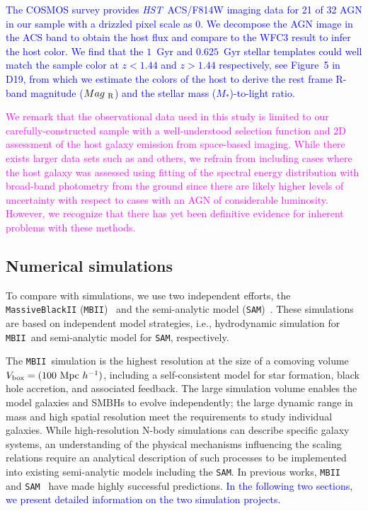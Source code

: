\documentclass[twocolumn,trackchanges]{aastex63}
\newcommand{\hst}{{\it HST}}
\newcommand{\mr}{$Mag_{\rm ~R}$}
\newcommand{\mstar}{{$M_*$}}
\newcommand{\sam}{\texttt{SAM}}
\newcommand{\mbii}{\texttt{MBII}}
\newcommand{\blue}[1]{{ \textcolor{blue}{#1}}}
\newcommand{\pink}[1]{{ \textcolor{magenta}{#1}}}
\begin{document}
\blue{The COSMOS survey provides \hst\ ACS/F814W imaging data for 21 of 32 AGN in our sample with a drizzled pixel scale as 0\farcs03. We decompose the AGN image in the ACS band to obtain the host flux and compare to the WFC3 result to infer the host color. We find that the $1$~Gyr and $0.625$~Gyr stellar templates could well match the sample color at $z<1.44$ and $z>1.44$ respectively, see Figure~5 in D19, from which we estimate the colors of the host to derive the rest frame R-band magnitude (\mr) and the stellar mass (\mstar)-to-light ratio.}

\pink{We remark that the observational data used in this study is limited to our carefully-constructed sample with a well-understood selection function and 2D assessment of the host galaxy emission from space-based imaging. While there exists larger data sets such as \citet{Sun2015} and others, we refrain from including cases where the host galaxy was assessed using fitting of the spectral energy distribution with broad-band photometry from the ground since there are likely higher levels of uncertainty with respect to cases with an AGN of considerable luminosity. However, we recognize that there has yet been definitive evidence for inherent problems with these methods.}

\subsection{Numerical simulations}\label{sample_sim}
To compare with simulations, we use two independent efforts, the \texttt{MassiveBlackII} (\texttt{MBII})~\citep{Khandai2015} and the semi-analytic model (\texttt{SAM})~\citep{Menci2014}. These simulations are based on independent model strategies, i.e., hydrodynamic simulation for \mbii\ and semi-analytic model for \sam, respectively.

The \mbii\ simulation is the highest resolution at the size of a comoving volume $V_{\rm box} = (100~{\rm Mpc}~h^{-1})$, including a self-consistent model for star formation, black hole accretion, and associated feedback. The large simulation volume enables the model galaxies and SMBHs to evolve independently; the large dynamic range in mass and high spatial resolution meet the requirements to study individual galaxies. While high-resolution N-body simulations can describe specific galaxy systems, an understanding of the physical mechanisms influencing the scaling relations require an analytical description of such processes to be implemented into existing semi-analytic models including the \sam. In previous works, \mbii~\citep{Huang2018, DeG++15, Khandai2015,Bhowmick2019} and \sam~\citep{Menci2014, Menci2016} have made highly successful predictions. \blue{In the following two sections, we present detailed information on the two simulation projects.}
\end{document}
